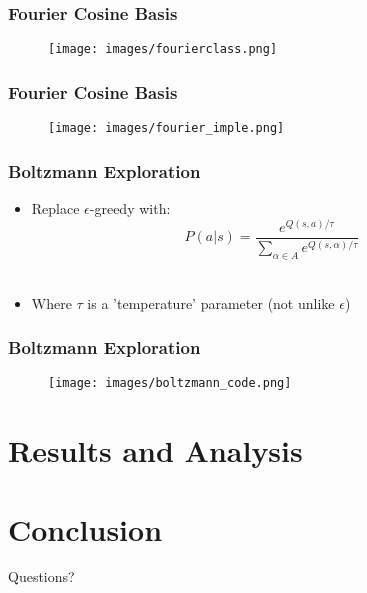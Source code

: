 \documentclass{beamer}
\begin{document}
\begin{frame}
    \frametitle{Fourier Cosine Basis}
    \begin{figure}
        \texttt{[image: images/fourierclass.png]}
    \end{figure}
\end{frame}

\begin{frame}
    \frametitle{Fourier Cosine Basis}
    \begin{figure}
        \texttt{[image: images/fourier\_imple.png]}
    \end{figure}
\end{frame}

\begin{frame}
    \frametitle{Boltzmann Exploration}
    \begin{itemize}
        \item Replace \(\epsilon\)-greedy with: \\[2em]
        \[ P(a|s) = \frac{e^{Q(s,a)/\tau}}{\sum_{\alpha\in A} e^{Q(s,\alpha)/\tau}} \] \\[2em]
        \item Where \(\tau\) is a 'temperature' parameter (not unlike \(\epsilon\))
    \end{itemize}
\end{frame}

\begin{frame}
    \frametitle{Boltzmann Exploration}
    \begin{figure}
        \texttt{[image: images/boltzmann\_code.png]}
    \end{figure}
\end{frame}

\section{Results and Analysis}

\section{Conclusion}




\begin{frame}
    Questions?
\end{frame}
\end{document}
